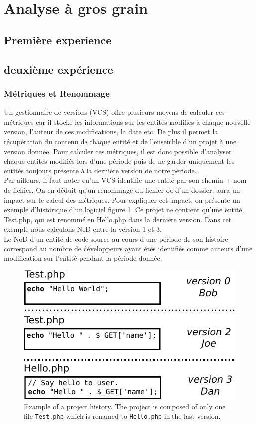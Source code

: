 \section{Analyse à gros grain}
\label{sec:analyse_gros_grain}

\subsection{Première experience}

\subsection{deuxième expérience}

\subsubsection{Métriques et Renommage}
Un gestionnaire de versions (VCS) offre plusieurs moyens de calculer ces métriques car il stocke les informations sur les entités modifiés à chaque nouvelle version, l'auteur de ces modifications, la date etc. De plus il permet la récupération du contenu de chaque entité et de l'ensemble d'un projet à une version donnée. Pour calculer ces métriques, il est donc possible d'analyser chaque entités modifiés lors d'une période puis de ne garder uniquement les entités toujours présente à la dernière version de notre période.\\
Par ailleurs, il faut noter qu'un VCS identifie une entité par son chemin + nom de fichier. On en déduit qu'un renommage du fichier ou d'un dossier, aura un impact sur le calcul des métriques. Pour expliquer cet impact, on présente un exemple d'historique d'un logiciel figure 1. Ce projet ne contient qu'une entité, Test.php, qui est renommé en Hello.php dans la dernière version. Dans cet exemple nous calculons NoD entre la version 1 et 3.\\
Le NoD d'un entité de code source au cours d'une période de son histoire correspond au nombre de développeurs ayant étés identifiés comme auteurs d'une modification sur l'entité pendant la période donnée.\\

\begin{figure}[t]
	\centering
	\includegraphics[width=0.8\linewidth,keepaspectratio]{data/figures/example.pdf}
	\caption{Example of a project history. The project is composed of only one file \texttt{Test.php} which is renamed to \texttt{Hello.php} in the last version.}
	\label{fig:example}
\end{figure}

